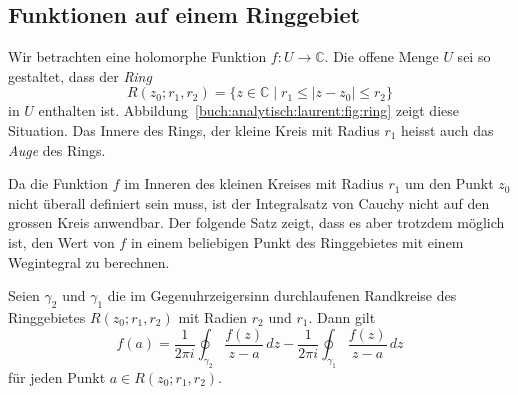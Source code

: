 %
%
%
\subsection{Funktionen auf einem Ringgebiet}
%
Wir betrachten eine holomorphe Funktion $f\colon U\to\mathbb{C}$.
Die offene Menge $U$ sei so gestaltet, dass der \emph{Ring}
\[
R(z_0;r_1,r_2)
=
\{
z\in\mathbb{C}
\mid
r_1 \le |z-z_0| \le r_2
\}
\]
in $U$ enthalten ist.
%
Abbildung~\ref{buch:analytisch:laurent:fig:ring} zeigt diese Situation.
Das Innere des Rings, der kleine Kreis mit Radius $r_1$ heisst auch
das \emph{Auge} des Rings.
%

Da die Funktion $f$ im Inneren des kleinen Kreises mit Radius $r_1$ um
den Punkt $z_0$ nicht überall definiert sein muss, ist der Integralsatz
von Cauchy nicht auf den grossen Kreis anwendbar.
Der folgende Satz zeigt, dass es aber trotzdem möglich ist, den Wert von
$f$ in einem beliebigen Punkt des Ringgebietes mit einem Wegintegral
zu berechnen.

\begin{satz}
Seien $\gamma_2$ und $\gamma_1$ die im Gegenuhrzeigersinn durchlaufenen
Randkreise des Ringgebietes $R(z_0;r_1,r_2)$ mit Radien $r_2$ und $r_1$.
Dann gilt
\begin{equation}
f(a)
=
\frac{1}{2\pi i}
\oint_{\gamma_2}
\frac{f(z)}{z-a}
\,dz
-
\frac{1}{2\pi i}
\oint_{\gamma_1}
\frac{f(z)}{z-a}
\,dz
\label{buch:analytisch:laurent:eqn:zweiintegrale}
\end{equation}
für jeden Punkt $a\in R(z_0;r_1,r_2)$.
\end{satz}

